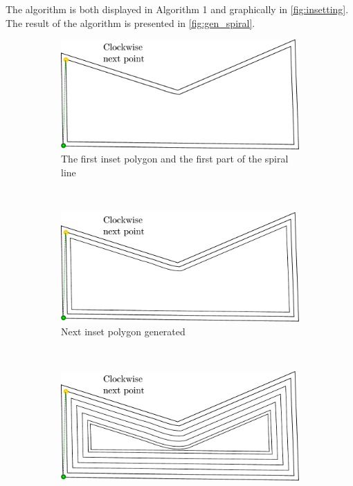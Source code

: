 The algorithm is both displayed in Algorithm 1 and graphically in \autoref{fig:insetting}. The result of the algorithm is presented in \autoref{fig:gen_spiral}.

\begin{figure}[htbp]
	\centering
    \begin{subfigure}[b]{0.45\textwidth}
    		\includegraphics[width=\textwidth]{images/algorithms/spiral_fill/2.pdf}
		\caption{The first inset polygon and the first part of the spiral line}
    \end{subfigure}
    ~
    \begin{subfigure}[b]{0.45\textwidth}
    		\includegraphics[width=\textwidth]{images/algorithms/spiral_fill/3.pdf}
    		\caption{Next inset polygon generated}
    \end{subfigure}\\
    \begin{subfigure}[b]{0.45\textwidth}
    		\includegraphics[width=\textwidth]{images/algorithms/spiral_fill/4.pdf}

\end{subfigure}
\end{figure}
